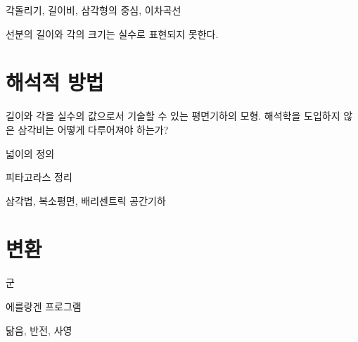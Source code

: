 \documentclass{../../large}
\begin{document}
각돌리기, 길이비, 삼각형의 중심, 이차곡선

선분의 길이와 각의 크기는 실수로 표현되지 못한다.

\section{해석적 방법}


길이와 각을 실수의 값으로서 기술할 수 있는 평면기하의 모형.
해석학을 도입하지 않은 삼각비는 어떻게 다루어져야 하는가?

넓이의 정의

피타고라스 정리

삼각법, 복소평면, 배리센트릭
공간기하

\section{변환}

군

에를랑겐 프로그램

닮음, 반전, 사영

\section{}
\end{document}
